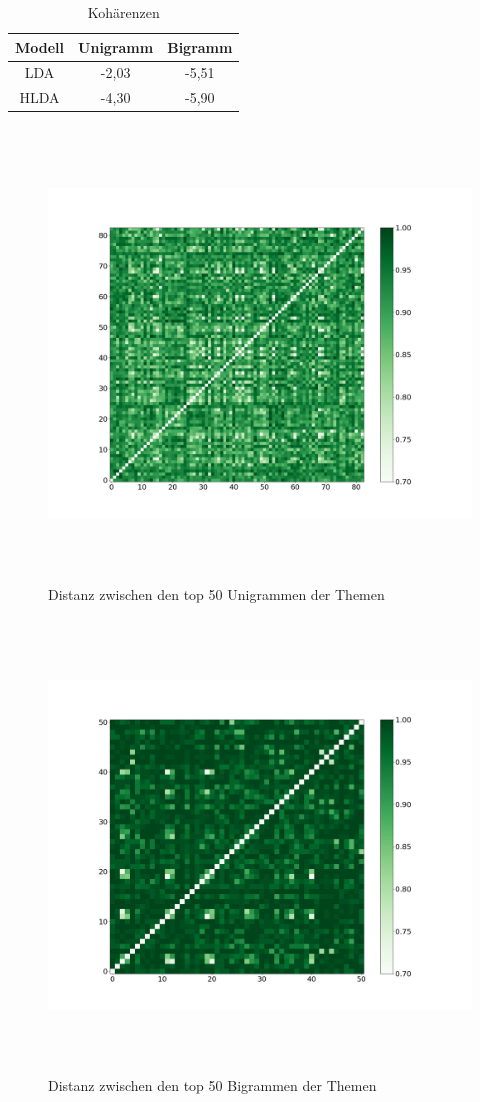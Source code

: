 \begin{table}
	\RawFloats
	\centering
	\caption{Kohärenzen}
	\begin{tabular}{|c|c|c|}
		\hline
		Modell & Unigramm & Bigramm \\
		\hline
		LDA & -2,03 & -5,51 \\
		\hline
		HLDA & -4,30 & -5,90 \\
		\hline
	\end{tabular}
	\label{table:Kohärenzen}
\end{table} 

\begin{figure}[htpb]
	\centering
	\includegraphics[width=\textwidth,height=12cm,keepaspectratio=true]{img/unigram_jaccard_50_green_07.png}
	\caption{
		Distanz zwischen den top 50 Unigrammen der Themen
	}
	\label{fig:Distanz_Unigramme}
\end{figure}

\begin{figure}[htpb]
	\centering
	\includegraphics[width=\textwidth,height=12cm,keepaspectratio=true]{img/bigram_jaccard_50_green_07.png}
	\caption{
		Distanz zwischen den top 50 Bigrammen der Themen
	}
	\label{fig:Distanz_Bigramme}
\end{figure}